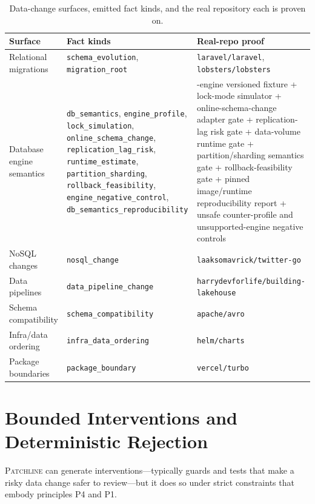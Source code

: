 \documentclass[11pt]{article}
\newcommand{\tool}{\textsc{Patchline}}
\newcommand{\code}[1]{\texttt{#1}}
\begin{document}
\begin{table}[h]\centering\small
\caption{Data-change surfaces, emitted fact kinds, and the real repository each is proven on.}
\label{tab:breadth}
\begin{tabular}{>{\raggedright\arraybackslash}p{3.2cm}>{\raggedright\arraybackslash}p{4.6cm}>{\raggedright\arraybackslash}p{4.8cm}}
\toprule
\textbf{Surface} & \textbf{Fact kinds} & \textbf{Real-repo proof} \\
\midrule
Relational migrations & \code{schema\_evolution}, \code{migration\_root} & \code{laravel/laravel}, \code{lobsters/lobsters} \\
Database engine semantics & \code{db\_semantics}, \code{engine\_profile}, \code{lock\_simulation}, \code{online\_schema\_change}, \code{replication\_lag\_risk}, \code{runtime\_estimate}, \code{partition\_sharding}, \code{rollback\_feasibility}, \code{engine\_negative\_control}, \code{db\_semantics\_reproducibility} & 8-engine versioned fixture + lock-mode simulator + online-schema-change adapter gate + replication-lag risk gate + data-volume runtime gate + partition/sharding semantics gate + rollback-feasibility gate + pinned image/runtime reproducibility report + unsafe counter-profile and unsupported-engine negative controls \\
NoSQL changes & \code{nosql\_change} & \code{laaksomavrick/twitter-go} \\
Data pipelines & \code{data\_pipeline\_change} & \code{harrydevforlife/building-lakehouse} \\
Schema compatibility & \code{schema\_compatibility} & \code{apache/avro} \\
Infra/data ordering & \code{infra\_data\_ordering} & \code{helm/charts} \\
Package boundaries & \code{package\_boundary} & \code{vercel/turbo} \\
\bottomrule
\end{tabular}
\end{table}

\section{Bounded Interventions and Deterministic Rejection}
\label{sec:intervention}

\tool{} can generate interventions---typically guards and tests that make a risky data change safer to
review---but it does so under strict constraints that embody principles P4 and P1.
\end{document}
